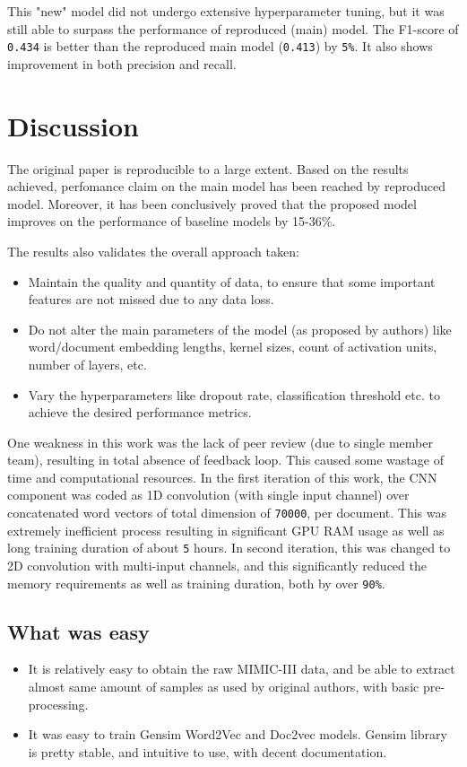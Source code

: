 \documentclass[11pt,a4paper]{article}
\begin{document}
This "new" model did not undergo extensive hyperparameter tuning, but it was still able to surpass the performance of reproduced (main) model. The F1-score of \texttt{0.434} is better than the reproduced main model (\texttt{0.413}) by \texttt{5\%}. It also shows improvement in both precision and recall.

\section{Discussion}

The original paper is reproducible to a large extent. Based on the results achieved, perfomance claim on the main model has been reached by reproduced model. Moreover, it has been conclusively proved that the proposed model improves on the performance of baseline models by 15-36\%.

The results also validates the overall approach taken:
\begin{itemize}
	\item Maintain the quality and quantity of data, to ensure that some important features are not missed due to any data loss.
	\item Do not alter the main parameters of the model (as proposed by authors) like word/document embedding lengths, kernel sizes, count of activation units, number of layers, etc.
	\item Vary the hyperparameters like dropout rate, classification threshold etc. to achieve the desired performance metrics. 
\end{itemize}

One weakness in this work was the lack of peer review (due to single member team), resulting in total absence of feedback loop. This caused some wastage of time and computational resources. In the first iteration of this work, the CNN component was coded as 1D convolution (with single input channel) over  concatenated word vectors of total dimension of \texttt{70000}, per document. This was extremely inefficient process resulting in significant GPU RAM usage as well as long training duration of about \texttt{5} hours. In second iteration, this was changed to 2D convolution with multi-input channels, and this significantly reduced the memory requirements as well as training duration, both by over \texttt{90\%}.

\subsection{What was easy}
\begin{itemize}
	\item It is relatively easy to obtain the raw MIMIC-III data, and be able to extract almost same amount of samples as used by original authors, with basic pre-processing. 
	\item It was easy to train Gensim Word2Vec and Doc2vec models. Gensim library is pretty stable, and intuitive to use, with decent documentation.
\end{itemize}
\end{document}
